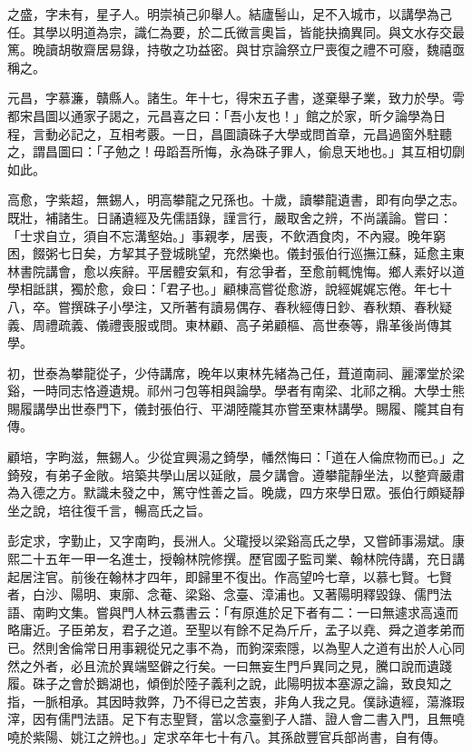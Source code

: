 \begin{pinyinscope}
之盛，字未有，星子人。明崇禎己卯舉人。結廬髻山，足不入城巿，以講學為己任。其學以明道為宗，識仁為要，於二氏微言奧旨，皆能抉摘異同。與文水存交最篤。晚讀胡敬齋居易錄，持敬之功益密。與甘京論祭立尸喪復之禮不可廢，魏禧亟稱之。

元昌，字慕濂，贛縣人。諸生。年十七，得宋五子書，遂棄舉子業，致力於學。雩都宋昌圖以通家子謁之，元昌喜之曰：「吾小友也！」館之於家，昕夕論學為日程，言動必記之，互相考覈。一日，昌圖讀硃子大學或問首章，元昌過窗外駐聽之，謂昌圖曰：「子勉之！毋蹈吾所悔，永為硃子罪人，偷息天地也。」其互相切劘如此。

高愈，字紫超，無錫人，明高攀龍之兄孫也。十歲，讀攀龍遺書，即有向學之志。既壯，補諸生。日誦遺經及先儒語錄，謹言行，嚴取舍之辨，不尚議論。嘗曰：「士求自立，須自不忘溝壑始。」事親孝，居喪，不飲酒食肉，不內寢。晚年窮困，餟粥七日矣，方挈其子登城眺望，充然樂也。儀封張伯行巡撫江蘇，延愈主東林書院講會，愈以疾辭。平居體安氣和，有忿爭者，至愈前輒愧悔。鄉人素好以道學相詆諆，獨於愈，僉曰：「君子也。」顧棟高嘗從愈游，說經娓娓忘倦。年七十八，卒。嘗撰硃子小學注，又所著有讀易偶存、春秋經傳日鈔、春秋類、春秋疑義、周禮疏義、儀禮喪服或問。東林顧、高子弟顧樞、高世泰等，鼎革後尚傳其學。

初，世泰為攀龍從子，少侍講席，晚年以東林先緒為己任，葺道南祠、麗澤堂於梁谿，一時同志恪遵遺規。祁州刁包等相與論學。學者有南梁、北祁之稱。大學士熊賜履講學出世泰門下，儀封張伯行、平湖陸隴其亦嘗至東林講學。賜履、隴其自有傳。

顧培，字畇滋，無錫人。少從宜興湯之錡學，幡然悔曰：「道在人倫庶物而已。」之錡歿，有弟子金敞。培築共學山居以延敞，晨夕講會。遵攀龍靜坐法，以整齊嚴肅為入德之方。默識未發之中，篤守性善之旨。晚歲，四方來學日眾。張伯行頗疑靜坐之說，培往復千言，暢高氏之旨。

彭定求，字勤止，又字南畇，長洲人。父瓏授以梁谿高氏之學，又嘗師事湯斌。康熙二十五年一甲一名進士，授翰林院修撰。歷官國子監司業、翰林院侍講，充日講起居注官。前後在翰林才四年，即歸里不復出。作高望吟七章，以慕七賢。七賢者，白沙、陽明、東廓、念菴、梁谿、念臺、漳浦也。又著陽明釋毀錄、儒門法語、南畇文集。嘗與門人林云翥書云：「有原進於足下者有二：一曰無遽求高遠而略庸近。子臣弟友，君子之道。至聖以有餘不足為斤斤，孟子以堯、舜之道孝弟而已。然則舍倫常日用事親從兄之事不為，而鉤深索隱，以為聖人之道有出於人心同然之外者，必且流於異端堅僻之行矣。一曰無妄生門戶異同之見，騰口說而遺踐履。硃子之會於鵝湖也，傾倒於陸子義利之說，此陽明拔本塞源之論，致良知之指，一脈相承。其因時救弊，乃不得已之苦衷，非角人我之見。僕詠遺經，蕩滌瑕滓，因有儒門法語。足下有志聖賢，當以念臺劉子人譜、證人會二書入門，且無嘵嘵於紫陽、姚江之辨也。」定求卒年七十有八。其孫啟豐官兵部尚書，自有傳。


\end{pinyinscope}
